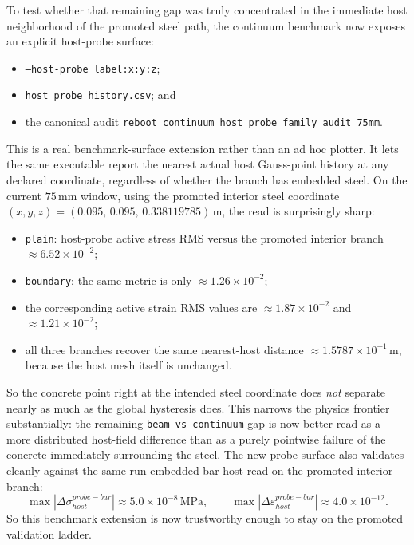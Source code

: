 To test whether that remaining gap was truly concentrated in the immediate
host neighborhood of the promoted steel path, the continuum benchmark now
exposes an explicit host-probe surface:
\begin{itemize}
  \item \texttt{--host-probe label:x:y:z};
  \item \texttt{host\_probe\_history.csv}; and
  \item the canonical audit
    \texttt{reboot\_continuum\_host\_probe\_family\_audit\_75mm}.
\end{itemize}
This is a real benchmark-surface extension rather than an ad hoc plotter.  It
lets the same executable report the nearest actual host Gauss-point history at
any declared coordinate, regardless of whether the branch has embedded steel.
On the current \(75\,\mathrm{mm}\) window, using the promoted interior steel
coordinate \((x,y,z)=(0.095,\,0.095,\,0.338119785)\,\mathrm{m}\), the read is
surprisingly sharp:
\begin{itemize}
  \item \texttt{plain}: host-probe active stress RMS versus the promoted
    interior branch \(\approx 6.52\times10^{-2}\);
  \item \texttt{boundary}: the same metric is only
    \(\approx 1.26\times10^{-2}\);
  \item the corresponding active strain RMS values are
    \(\approx 1.87\times10^{-2}\) and \(\approx 1.21\times10^{-2}\);
  \item all three branches recover the same nearest-host distance
    \(\approx 1.5787\times10^{-1}\,\mathrm{m}\), because the host mesh itself
    is unchanged.
\end{itemize}
So the concrete point right at the intended steel coordinate does \emph{not}
separate nearly as much as the global hysteresis does.  This narrows the
physics frontier substantially: the remaining \texttt{beam vs continuum} gap
is now better read as a more distributed host-field difference than as a
purely pointwise failure of the concrete immediately surrounding the steel.
The new probe surface also validates cleanly against the same-run embedded-bar
host read on the promoted interior branch:
\[
\max |\Delta \sigma_{host}^{probe-bar}| \approx 5.0\times10^{-8}\,\mathrm{MPa},
\qquad
\max |\Delta \varepsilon_{host}^{probe-bar}| \approx 4.0\times10^{-12}.
\]
So this benchmark extension is now trustworthy enough to stay on the promoted
validation ladder.

